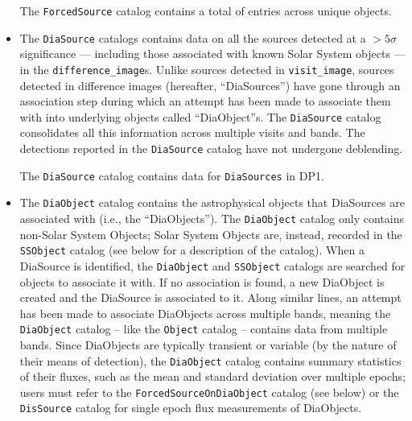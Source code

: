 \begin{itemize}
The \texttt{ForcedSource} catalog contains a total of \nforcedsources entries across \nforcedobjects unique objects.


\item The \texttt{DiaSource} catalogs contains data on all the sources detected at a $>5\sigma$ significance --- including those associated with known Solar System objects --- in the \texttt{difference\_image}s.
Unlike sources detected in \texttt{visit\_image}, sources detected in difference images (hereafter, ``DiaSources'') have gone through an association step during which an attempt has been made to associate them with into underlying objects called ``DiaObject''s. The \texttt{DiaSource} catalog consolidates all this information across multiple visits and bands. The detections reported in the \texttt{DiaSource} catalog have not undergone deblending.

The \texttt{DiaSource} catalog contains data for \ndiasources \texttt{DiaSources} in \gls{DP1}.


\item The \texttt{DiaObject} catalog contains the astrophysical objects that DiaSources are associated with (i.e., the ``DiaObjects'').
The \texttt{DiaObject} catalog only contains non-Solar System Objects; Solar System Objects are, instead, recorded in the \texttt{SSObject} catalog (see below for a description of the  catalog).
When a DiaSource is identified, the \texttt{DiaObject} and \texttt{SSObject} catalogs are searched for objects to associate it with.
If no association is found, a new DiaObject is created and the DiaSource is associated to it.
Along similar lines, an attempt has been made to associate DiaObjects across multiple bands, meaning the \texttt{DiaObject} catalog -- like the \texttt{Object} catalog -- contains data from multiple bands.
Since DiaObjects are typically transient or variable (by the nature of their means of detection), the \texttt{DiaObject} catalog contains summary statistics of their fluxes, such as the mean and standard deviation over multiple epochs; users must refer to the \texttt{ForcedSourceOnDiaObject} catalog (see below) or the \texttt{DisSource} catalog for single epoch \gls{flux} measurements of DiaObjects.


\end{itemize}
